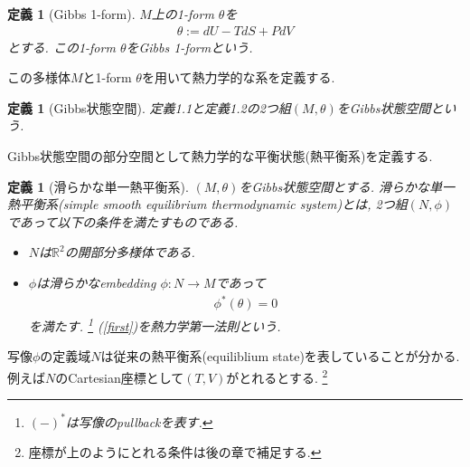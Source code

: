 \documentclass[a4paper,12pt]{ltjsarticle}
\theoremstyle{break}
\newtheorem{defn}[thm]{定義}
\newcommand{\mbr}{\mathbb{R}}
\numberwithin{equation}{section}
\begin{document}
\begin{defn}[Gibbs 1-form]
  $M$上の1-form $\theta$を
  \begin{align}
    \label{gibbs}
    \theta 
    := dU - TdS + PdV
  \end{align}
  とする. 
  この1-form $\theta$をGibbs 1-formという. 
\end{defn}

この多様体$M$と1-form $\theta$を用いて熱力学的な系を定義する. 

\begin{defn}[Gibbs状態空間]
  定義1.1と定義1.2の2つ組$(M,\theta)$をGibbs状態空間という. 
\end{defn}

Gibbs状態空間の部分空間として熱力学的な平衡状態(熱平衡系)を定義する. 

\begin{defn}[滑らかな単一熱平衡系]
  $(M,\theta)$をGibbs状態空間とする. 
  滑らかな単一熱平衡系(simple smooth equilibrium thermodynamic system)とは, 2つ組$(N,\phi)$であって以下の条件を満たすものである. 
  \begin{itemize}
    \item $N$は$\mbr^2$の開部分多様体である. 
    \item $\phi$は滑らかなembedding $\phi: N \to M$であって
     \begin{align}
      \label{first}
      \phi^*(\theta)
      = 0
     \end{align}
    を満たす. 
    \footnote{
      $(-)^*$は写像のpullbackを表す. 
    }
    (\ref{first})を熱力学第一法則という. 
  \end{itemize}
\end{defn}


写像$\phi$の定義域$N$は従来の熱平衡系(equiliblium state)を表していることが分かる. 
例えば$N$のCartesian座標として$(T,V)$がとれるとする. 
\footnote{
  座標が上のようにとれる条件は後の章で補足する. 
}
\end{document}
